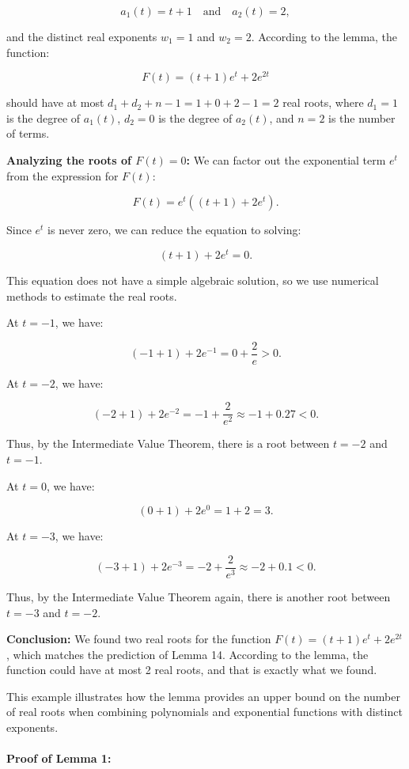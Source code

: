 \documentclass{article}
\begin{document}
\[
a_1(t) = t + 1 \quad \text{and} \quad a_2(t) = 2,
\]

and the distinct real exponents \( w_1 = 1 \) and \( w_2 = 2 \). According to the lemma, the function:

\[
F(t) = (t + 1) e^t + 2 e^{2t}
\]

should have at most \( d_1 + d_2 + n - 1 = 1 + 0 + 2 - 1 = 2 \) real roots, where \( d_1 = 1 \) is the degree of \( a_1(t) \), \( d_2 = 0 \) is the degree of \( a_2(t) \), and \( n = 2 \) is the number of terms.

\textbf{Analyzing the roots of \( F(t) = 0 \):}
We can factor out the exponential term \( e^t \) from the expression for \( F(t) \):

\[
F(t) = e^t \left( (t + 1) + 2 e^t \right).
\]

Since \( e^t \) is never zero, we can reduce the equation to solving:

\[
(t + 1) + 2 e^t = 0.
\]

This equation does not have a simple algebraic solution, so we use numerical methods to estimate the real roots.

At \( t = -1 \), we have:

\[
(-1 + 1) + 2 e^{-1} = 0 + \frac{2}{e} > 0.
\]

At \( t = -2 \), we have:

\[
(-2 + 1) + 2 e^{-2} = -1 + \frac{2}{e^2} \approx -1 + 0.27 < 0.
\]

Thus, by the Intermediate Value Theorem, there is a root between \( t = -2 \) and \( t = -1 \).

At \( t = 0 \), we have:

\[
(0 + 1) + 2 e^0 = 1 + 2 = 3.
\]

At \( t = -3 \), we have:

\[
(-3 + 1) + 2 e^{-3} = -2 + \frac{2}{e^3} \approx -2 + 0.1 < 0.
\]

Thus, by the Intermediate Value Theorem again, there is another root between \( t = -3 \) and \( t = -2 \).

\textbf{Conclusion:} 
We found two real roots for the function \( F(t) = (t + 1) e^t + 2 e^{2t} \), which matches the prediction of Lemma 14. According to the lemma, the function could have at most 2 real roots, and that is exactly what we found.

This example illustrates how the lemma provides an upper bound on the number of real roots when combining polynomials and exponential functions with distinct exponents.\\\\
\textbf{Proof of Lemma 1:}\\\\
\end{document}
